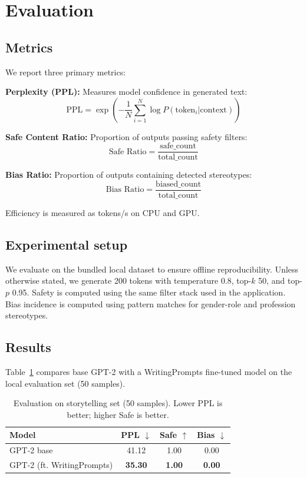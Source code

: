 \documentclass[conference]{IEEEtran}
\begin{document}
\section{Evaluation}
\subsection{Metrics}
We report three primary metrics:

\textbf{Perplexity (PPL):} Measures model confidence in generated text:
\[
\text{PPL} = \exp\left(-\frac{1}{N}\sum_{i=1}^{N} \log P(\text{token}_i | \text{context})\right)
\]

\textbf{Safe Content Ratio:} Proportion of outputs passing safety filters:
\[
\text{Safe Ratio} = \frac{\text{safe\_count}}{\text{total\_count}}
\]

\textbf{Bias Ratio:} Proportion of outputs containing detected stereotypes:
\[
\text{Bias Ratio} = \frac{\text{biased\_count}}{\text{total\_count}}
\]

Efficiency is measured as tokens/s on CPU and GPU.

\subsection{Experimental setup}
We evaluate on the bundled local dataset to ensure offline reproducibility. Unless otherwise stated, we generate 200 tokens with temperature 0.8, top-$k$ 50, and top-$p$ 0.95. Safety is computed using the same filter stack used in the application. Bias incidence is computed using pattern matches for gender-role and profession stereotypes.

\subsection{Results}
Table~\ref{tab:results} compares base GPT-2 with a WritingPrompts fine-tuned model on the local evaluation set (50 samples).

\begin{table}[t]
    \centering
    \caption{Evaluation on storytelling set (50 samples). Lower PPL is better; higher Safe is better.}
    \label{tab:results}
    \begin{tabular}{lccc}
        \toprule
        Model & PPL $\downarrow$ & Safe $\uparrow$ & Bias $\downarrow$ \\
        \midrule
        GPT-2 base & 41.12 & 1.00 & 0.00 \\
        GPT-2 (ft. WritingPrompts) & \textbf{35.30} & \textbf{1.00} & \textbf{0.00} \\
        \bottomrule
    \end{tabular}
\end{table}
\end{document}
